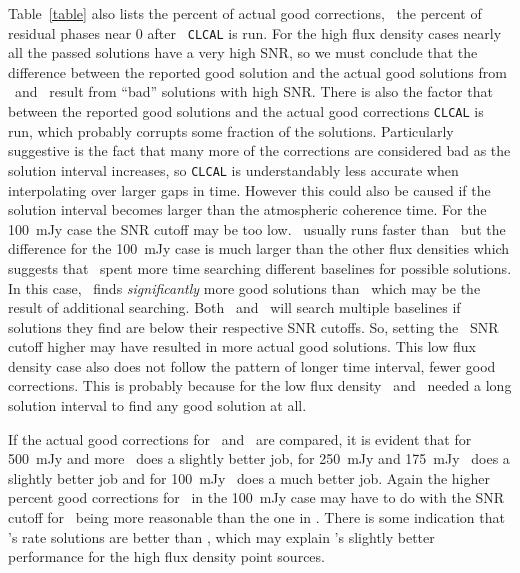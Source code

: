 Table~\ref{table} also lists the percent of actual
good corrections, \ie\ the percent of residual phases near 0 after {\tt
CLCAL} is run.
For the high flux density cases nearly all the passed solutions have
a very high SNR, so we must
conclude that the difference between the reported good solution and the
actual good solutions from \FR\ and \KR\ result from
``bad'' solutions with high SNR\@.  There is also the factor that
between the reported good solutions and the actual good corrections {\tt CLCAL}
is run, which probably corrupts some fraction of the solutions.
Particularly suggestive is the fact that many more of the corrections
are considered bad as the solution interval increases, so {\tt CLCAL}
is understandably less accurate when interpolating over larger gaps in time.
However this could also be caused if the solution interval becomes larger
than the atmospheric coherence time.
For the 100~mJy case the SNR cutoff may be too low.  \KR\ usually
runs faster than \FR\ but the difference for the
100~mJy case is much larger than the other flux densities which suggests
that \FR\ spent more time searching different baselines for possible
solutions.  In this case, \FR\ finds {\it significantly} more good solutions
than \KR\, which may be the result of additional searching.
Both \FR\ and \KR\ will search multiple baselines if solutions they find are
below their respective SNR cutoffs.  So, setting the \KR\ SNR cutoff higher may
have resulted in more actual good solutions.  This low flux density case also
does not follow the pattern of longer time interval, fewer good corrections.
This is probably because for the low flux density \FR\ and \KR\ needed a
long solution interval to find any good solution at all.

If the actual good corrections for \FR\ and \KR\ are compared, it is evident
that for 500~mJy and more \KR\ does a slightly better job, for 250~mJy
and 175~mJy \FR\ does a slightly better job and for 100~mJy \FR\
does a much better job.  Again the higher percent good corrections for
\FR\ in the 100~mJy case may have to do with the SNR cutoff for \FR\
being more reasonable than the one in \KR\@.  There is some indication
that \KR's rate solutions are better than \FR, which may explain \KR's
slightly better performance for the high flux density point sources.

